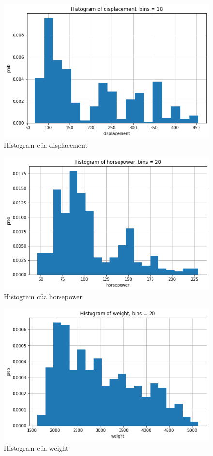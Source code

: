 \documentclass[a4paper, 12pt]{article}
\begin{document}
        \begin{figure}[H]
            \centering
                \includegraphics[scale=0.9]{img/displacement.png}
                \caption{Histogram của displacement}
        \end{figure}
        
        \begin{figure}[H]
            \centering
                \includegraphics[scale=0.9]{img/horsepower.png}
                \caption{Histogram của horsepower}
        \end{figure}
        
        \begin{figure}[H]
            \centering
                \includegraphics[scale=0.9]{img/weight.png}
                \caption{Histogram của weight}
        \end{figure}
    
\end{document}
